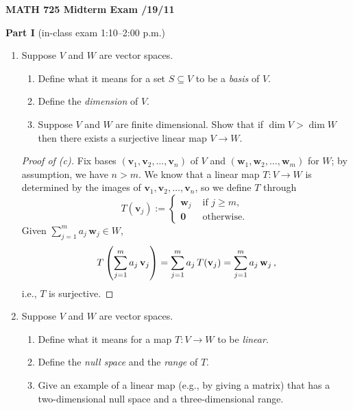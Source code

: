 \documentclass[12pt]{amsart}
\def\0{\mathbf 0}
\def\v{\mathbf v}
\def\w{\mathbf w}
\begin{document}
\setlength{\parindent}{0pt}
\setlength{\parskip}{0.4cm}

\pagestyle{empty} 


\begin{center} {\bf MATH 725 \qquad Midterm Exam /19/11 \qquad } \end{center} 

{\bf Part I} (in-class exam 1:10--2:00 p.m.)

\thispagestyle{empty} 

\begin{enumerate} 

\item Suppose $V$ and $W$ are vector spaces.
  \begin{enumerate} 
  \item Define what it means for a set $S \subseteq V$ to be a \emph{basis} of $V$.
  \item Define the \emph{dimension} of $V$.
  \item Suppose $V$ and $W$ are finite dimensional. Show that if $\dim V > \dim W$ then there exists a surjective linear map $V \to W$.
  \end{enumerate}

\begin{proof}[Proof of {\rm (c)}]
Fix bases $\left( \v_1, \v_2, \dots, \v_n \right)$ of $V$ and $\left( \w_1, \w_2, \dots, \w_m \right)$ for $W$; by assumption, we have $n > m$.
We know that a linear map $T: V \to W$ is determined by the images of $\v_1, \v_2, \dots, \v_n$, so we define $T$ through
\[
  T(\v_j) := \begin{cases}
    \w_j & \text{ if } j \ge m, \\
    \0 & \text{ otherwise. }
  \end{cases}
\]
Given $\sum_{ j=1 }^m a_j \, \w_j \in W$,
\[
  T \left( \sum_{ j=1 }^m a_j \, \v_j \right)
  = \sum_{ j=1 }^m a_j \, T(\v_j) \\
  = \sum_{ j=1 }^m a_j \, \w_j \, ,
\]
i.e., $T$ is surjective.
\end{proof}

\item Suppose $V$ and $W$ are vector spaces.
  \begin{enumerate} 
  \item Define what it means for a map $T: V \to W$ to be \emph{linear}.
  \item Define the \emph{null space} and the \emph{range} of $T$.
  \item Give an example of a linear map (e.g., by giving a matrix) that has a two-dimensional null space and a three-dimensional range.
  \end{enumerate}


\end{enumerate}
\end{document}
